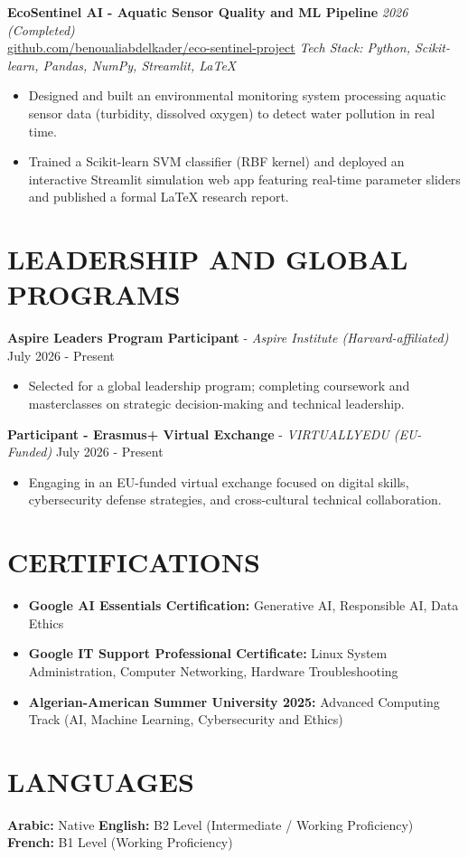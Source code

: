 \documentclass[10pt,letterpaper]{article}
\begin{document}
\vspace{1pt}
\textbf{EcoSentinel AI - Aquatic Sensor Quality and ML Pipeline} \hfill \textit{2026 (Completed)}\\
\mbox{\href{https://github.com/benoualiabdelkader/eco-sentinel-project}{github.com/benoualiabdelkader/eco-sentinel-project}} \hfill \textit{Tech Stack: Python, Scikit-learn, Pandas, NumPy, Streamlit, \LaTeX}
\begin{itemize}
    \item Designed and built an environmental monitoring system processing aquatic sensor data (turbidity, dissolved oxygen) to detect water pollution in real time.
    \item Trained a Scikit-learn SVM classifier (RBF kernel) and deployed an interactive Streamlit simulation web app featuring real-time parameter sliders and published a formal \LaTeX{} research report.
\end{itemize}

\section*{LEADERSHIP AND GLOBAL PROGRAMS}
\textbf{Aspire Leaders Program Participant} - \textit{Aspire Institute (Harvard-affiliated)} \hfill July 2026 - Present
\begin{itemize}
    \item Selected for a global leadership program; completing coursework and masterclasses on strategic decision-making and technical leadership.
\end{itemize}

\vspace{1pt}
\textbf{Participant - Erasmus+ Virtual Exchange} - \textit{VIRTUALLYEDU (EU-Funded)} \hfill July 2026 - Present
\begin{itemize}
    \item Engaging in an EU-funded virtual exchange focused on digital skills, cybersecurity defense strategies, and cross-cultural technical collaboration.
\end{itemize}

\section*{CERTIFICATIONS}
\begin{itemize}
    \item \textbf{Google AI Essentials Certification:} Generative AI, Responsible AI, Data Ethics
    \item \textbf{Google IT Support Professional Certificate:} Linux System Administration, Computer Networking, Hardware Troubleshooting
    \item \textbf{Algerian-American Summer University 2025:} Advanced Computing Track (AI, Machine Learning, Cybersecurity and Ethics)
\end{itemize}

\section*{LANGUAGES}
\textbf{Arabic:} Native \quad\textbullet\quad \textbf{English:} B2 Level (Intermediate / Working Proficiency) \quad\textbullet\quad \textbf{French:} B1 Level (Working Proficiency)
\end{document}
